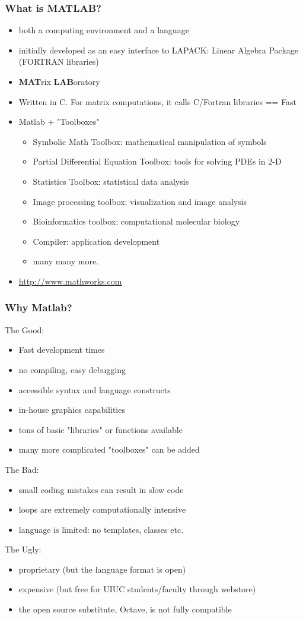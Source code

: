 \documentclass[10pt]{beamer}
\begin{document}
\begin{frame}
\frametitle{What is MATLAB?}
\begin{itemize}
\item both a computing environment and a language
\item initially developed as an easy interface to LAPACK: Linear Algebra
Package (FORTRAN libraries)
\item {\bf MAT}rix {\bf LAB}oratory
\item Written in C.  For matrix computations, it calls C/Fortran libraries == Fast
\item Matlab + "Toolboxes"
  \begin{itemize}
  \item Symbolic Math Toolbox: mathematical manipulation of symbols
  \item Partial Differential Equation Toolbox: tools for solving PDEs in 2-D
  \item Statistics Toolbox: statistical data analysis
  \item Image processing toolbox: visualization and image analysis
  \item Bioinformatics toolbox: computational molecular biology
  \item Compiler: application development
  \item many many more.
  \end{itemize}
\item {\url{http://www.mathworks.com}}
\end{itemize}
\end{frame}
\begin{frame}
\frametitle{Why Matlab?}
The Good:
\begin{itemize}
\item Fast development times
\item no compiling, easy debugging
\item accessible syntax and language constructs
\item in-house graphics capabilities
\item tons of basic "libraries" or functions available
\item many more complicated "toolboxes" can be added
\end{itemize}
The Bad:
\begin{itemize}
\item small coding mistakes can result in slow code
\item loops are extremely computationally intensive
\item language is limited: no templates, classes etc.
\end{itemize}
The Ugly:
\begin{itemize}
\item proprietary (but the language format is open)
\item expensive (but free for UIUC students/faculty through webstore)
\item the open source substitute, Octave, is not fully compatible
\end{itemize}
\end{frame}
\end{document}
